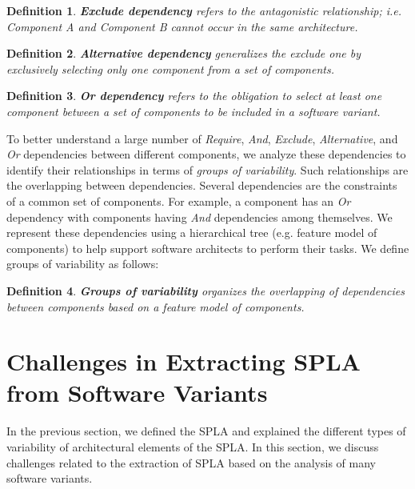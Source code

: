\documentclass[graybox]{svmult}
\newtheorem{mydef}{Definition}
\begin{document}
\begin{mydef}
\textbf{Exclude dependency} refers to the antagonistic relationship; i.e. \textit{Component A} and \textit{Component B} cannot occur in the same architecture.
\end{mydef}

\begin{mydef}
\textbf{Alternative dependency} generalizes the exclude one by exclusively selecting only one component from a set of components.
\end{mydef}

\begin{mydef}
\textbf{Or dependency} refers to the obligation to select at least one component between a set of components to be included in a software variant. 
\end{mydef}

To better understand a large number of \textit{Require}, \textit{And},  \textit{Exclude}, \textit{Alternative}, and \textit{Or} dependencies between different components, we analyze these dependencies to identify their relationships in terms of \textit{groups of variability}. Such relationships are the overlapping between dependencies. 
Several dependencies are the constraints of a common set of components. For example, a component has an \textit{Or} dependency with components having \textit{And} dependencies among themselves. We represent these dependencies using a hierarchical tree (e.g. feature model of components) to help support software architects to perform their tasks. We define groups of variability as follows:

\begin{mydef}
\textbf{Groups of variability} organizes the overlapping of dependencies between components based on a feature model of components. 
\end{mydef}



\section{Challenges in Extracting SPLA from Software Variants}
\label{sec-challanges}
In the previous section, we defined the SPLA and explained the different types of variability of architectural elements of the SPLA. In this section, we discuss challenges related to the extraction of SPLA based on the analysis of many software variants. 
\end{document}
